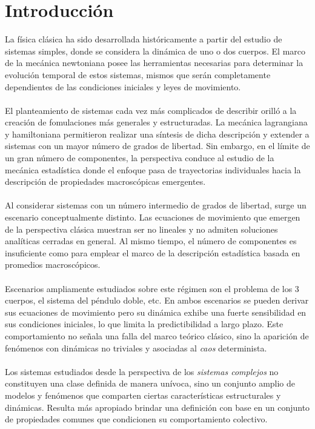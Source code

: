 \chapter{Introducción}

\setlength{\parindent}{0cm} La física clásica ha sido desarrollada históricamente a partir del estudio de sistemas simples, donde se considera la dinámica de uno o dos cuerpos. El marco de la mecánica newtoniana posee las herramientas necesarias para determinar la evolución temporal de estos sistemas, mismos que serán completamente dependientes de las condiciones iniciales y leyes de movimiento.\\
\\
El planteamiento de sistemas cada vez más complicados de describir orilló a la creación de fomulaciones más generales y estructuradas. La mecánica lagrangiana y hamiltoniana permitieron realizar una síntesis de dicha descripción y extender a sistemas con un mayor número de grados de libertad. Sin embargo, en el límite de un gran número de componentes, la perspectiva conduce al estudio de la mecánica estadística donde el enfoque pasa de trayectorias individuales hacia la descripción de propiedades macroscópicas emergentes.\\
\\
Al considerar sistemas con un número intermedio de grados de libertad, surge un escenario conceptualmente distinto. Las ecuaciones de movimiento que emergen de la perspectiva clásica muestran ser no lineales y no admiten soluciones analíticas cerradas en general. Al mismo tiempo, el número de componentes es insuficiente como para emplear el marco de la descripción estadística basada en promedios macroscópicos.\\
\\
Escenarios ampliamente estudiados sobre este régimen son el problema de los 3 cuerpos, el sistema del péndulo doble, etc. En ambos escenarios se pueden derivar sus ecuaciones de movimiento pero su dinámica exhibe una fuerte sensibilidad en sus condiciones iniciales, lo que limita la predictibilidad a largo plazo. Este comportamiento no señala una falla del marco teórico clásico, sino la aparición de fenómenos con dinámicas no triviales y asociadas al \textit{caos} determinista.\\
\\
Los sistemas estudiados desde la perspectiva de los \textit{sistemas complejos} no constituyen una clase definida de manera unívoca, sino un conjunto amplio de modelos y fenómenos que comparten ciertas características estructurales y dinámicas. Resulta más apropiado brindar una definición con base en un conjunto de propiedades comunes que condicionen su comportamiento colectivo.\\
